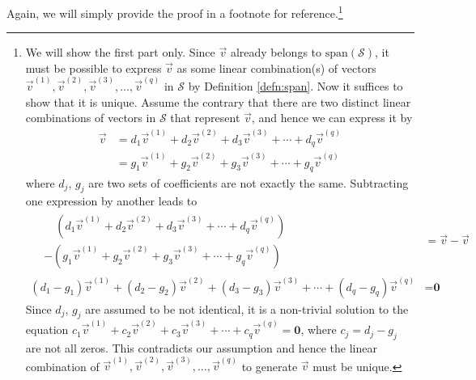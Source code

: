 Again, we will simply provide the proof in a footnote for reference.\footnote{We will show the first part only. Since $\vec{v}$ already belongs to $\text{span}(\mathcal{S})$, it must be possible to express $\vec{v}$ as some linear combination(s) of vectors $\vec{v}^{(1)}, \vec{v}^{(2)}, \vec{v}^{(3)}, \ldots, \vec{v}^{(q)}$ in $\mathcal{S}$ by Definition \ref{defn:span}. Now it suffices to show that it is unique. Assume the contrary that there are two distinct linear combinations of vectors in $\mathcal{S}$ that represent $\vec{v}$, and hence we can express it by
\begin{align*}
\vec{v} &= d_1\vec{v}^{(1)} + d_2\vec{v}^{(2)} + d_3\vec{v}^{(3)} + \cdots + d_q\vec{v}^{(q)} \\
&= g_1\vec{v}^{(1)} + g_2\vec{v}^{(2)} + g_3\vec{v}^{(3)} + \cdots + g_q\vec{v}^{(q)}
\end{align*}
where $d_j$, $g_j$ are two sets of coefficients are not exactly the same. Subtracting one expression by another leads to
\begin{align*}
\begin{aligned}
&\quad (d_1\vec{v}^{(1)} + d_2\vec{v}^{(2)} + d_3\vec{v}^{(3)} + \cdots + d_q\vec{v}^{(q)}) \\
& -(g_1\vec{v}^{(1)} + g_2\vec{v}^{(2)} + g_3\vec{v}^{(3)} + \cdots + g_q\vec{v}^{(q)})
\end{aligned}
&= \vec{v} - \vec{v} \\
(d_1 - g_1)\vec{v}^{(1)} + (d_2 - g_2)\vec{v}^{(2)} + (d_3 - g_3)\vec{v}^{(3)} + \cdots + (d_q - g_q)\vec{v}^{(q)} &= \textbf{0} 
\end{align*}
Since $d_j$, $g_j$ are assumed to be not identical, it is a non-trivial solution to the equation $c_1\vec{v}^{(1)} + c_2\vec{v}^{(2)} + c_3\vec{v}^{(3)} + \cdots + c_q\vec{v}^{(q)} = \textbf{0}$, where $c_j = d_j - g_j$ are not all zeros. This contradicts our assumption and hence the linear combination of $\vec{v}^{(1)}, \vec{v}^{(2)}, \vec{v}^{(3)}, \ldots, \vec{v}^{(q)}$ to generate $\vec{v}$ must be unique.}
